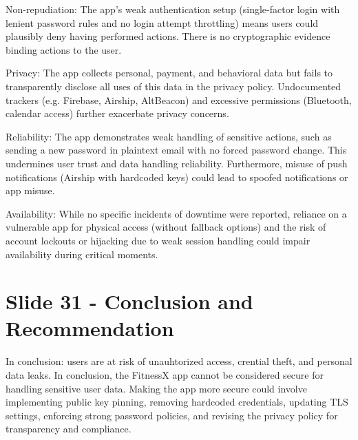 \documentclass[12pt,a4paper]{article}
\begin{document}
Non-repudiation: The app's weak authentication setup (single-factor login with lenient password rules and no login attempt throttling) means users could plausibly deny having performed actions. There is no cryptographic evidence binding actions to the user.

Privacy: The app collects personal, payment, and behavioral data but fails to transparently disclose all uses of this data in the privacy policy. Undocumented trackers (e.g. Firebase, Airship, AltBeacon) and excessive permissions (Bluetooth, calendar access) further exacerbate privacy concerns.

Reliability: The app demonstrates weak handling of sensitive actions, such as sending a new password in plaintext email with no forced password change. This undermines user trust and data handling reliability. Furthermore, misuse of push notifications (Airship with hardcoded keys) could lead to spoofed notifications or app misuse.

Availability: While no specific incidents of downtime were reported, reliance on a vulnerable app for physical access (without fallback options) and the risk of account lockouts or hijacking due to weak session handling could impair availability during critical moments.


\section*{Slide 31 - Conclusion and Recommendation}
In conclusion: users are at risk of unauhtorized access, crential theft, and personal data leaks. In conclusion, the FitnessX app cannot be considered secure for handling sensitive user data. Making the app more secure could involve implementing public key pinning, removing hardcoded credentials, updating TLS settings, enforcing strong password policies, and revising the privacy policy for transparency and compliance.
\end{document}
